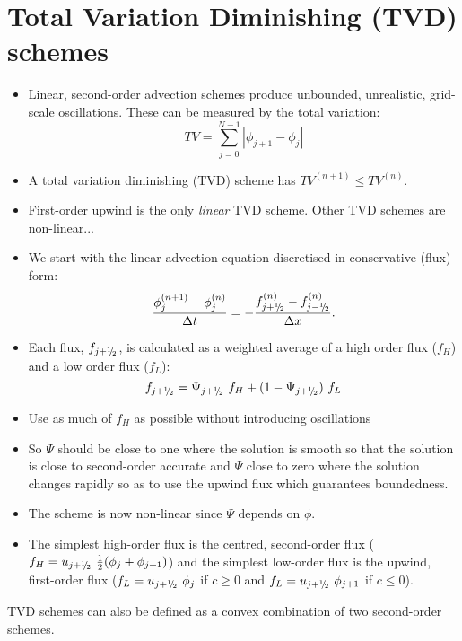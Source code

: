 \clearpage
\section{Total Variation Diminishing (TVD) schemes}

\begin{itemize}
\item
Linear, second-order advection schemes produce unbounded, unrealistic, grid-scale oscillations. These can be measured by the total variation:
\begin{equation*}
TV = \sum_{j=0}^{N-1}|\phi_{j+1}-\phi_j|
\end{equation*}
\item 
A total variation diminishing (TVD) scheme has $TV^{(n+1)} \le TV^{(n)}$.
\item
First-order upwind is the only {\em linear} TVD scheme. Other TVD schemes are non-linear...
\item
We start with the linear advection equation discretised in conservative (flux) form:
\begin{equation}
\frac{\phi_j^{(n+1)} - \phi_j^{(n)}}{\Delta t} = -\frac{f_{j+{^1\negthickspace/\negthinspace_2}}^{(n)} - f_{j-{^1\negthickspace/\negthinspace_2}}^{(n)}}{\Delta x}.
\end{equation}
\item
Each flux, $f_{j+{^1\negthickspace/\negthinspace_2}}$, is calculated as a weighted average of a high order flux ($f_H$) and a low order flux ($f_L$):
\begin{equation*}
f_{j+{^1\negthickspace/\negthinspace_2}} = \Psi_{j+{^1\negthickspace/\negthinspace_2}} ~f_H + (1-\Psi_{j+{^1\negthickspace/\negthinspace_2}}) ~f_L
\end{equation*}
\item
Use as much of $f_H$ as possible without introducing oscillations
\item
So $\Psi$ should be close to one where the solution is smooth so that the solution is close to second-order accurate and $\Psi$ close to zero where the solution changes rapidly so as to use the upwind flux which guarantees boundedness.
\item The scheme is now non-linear since $\Psi$ depends on $\phi$.
\item
The simplest high-order flux is the centred, second-order flux ($f_H=u_{j+{^1\negthickspace/\negthinspace_2}} ~\tfrac{1}{2}(\phi_{j} + \phi_{j+1})$) and the simplest low-order flux is the upwind, first-order flux ($f_L=u_{j+{^1\negthickspace/\negthinspace_2}}~ \phi_j$ if $c\ge 0$ and $f_L=u_{j+{^1\negthickspace/\negthinspace_2}}~ \phi_{j+1}$ if $c\le 0$).
\end{itemize}

\clearpage
TVD schemes can also be defined as a convex combination of two second-order schemes. 

